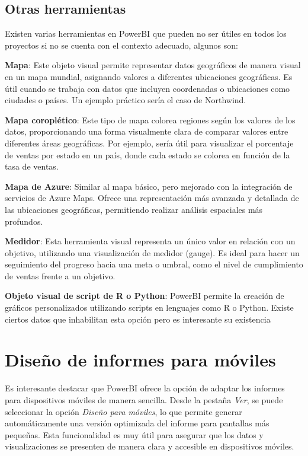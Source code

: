 \documentclass[12pt, a4paper, twoside]{article}
\begin{document}
	
	\subsection{Otras herramientas}
	
	Existen varias herramientas en PowerBI que pueden no ser útiles en todos los proyectos si no se cuenta con el contexto adecuado, algunos son:
	
	\textbf{Mapa}: Este objeto visual permite representar datos geográficos de manera visual en un mapa mundial, asignando valores a diferentes ubicaciones geográficas. Es útil cuando se trabaja con datos que incluyen coordenadas o ubicaciones como ciudades o países. Un ejemplo práctico sería el caso de Northwind.
	
	\textbf{Mapa coroplético}: Este tipo de mapa colorea regiones según los valores de los datos, proporcionando una forma visualmente clara de comparar valores entre diferentes áreas geográficas. Por ejemplo, sería útil para visualizar el porcentaje de ventas por estado en un país, donde cada estado se colorea en función de la tasa de ventas.
	
	\textbf{Mapa de Azure}: Similar al mapa básico, pero mejorado con la integración de servicios de Azure Maps. Ofrece una representación más avanzada y detallada de las ubicaciones geográficas, permitiendo realizar análisis espaciales más profundos.
	
	\textbf{Medidor}: Esta herramienta visual representa un único valor en relación con un objetivo, utilizando una visualización de medidor (gauge). Es ideal para hacer un seguimiento del progreso hacia una meta o umbral, como el nivel de cumplimiento de ventas frente a un objetivo.
	
	\textbf{Objeto visual de script de R o Python}: PowerBI permite la creación de gráficos personalizados utilizando scripts en lenguajes como R o Python. Existe ciertos datos que inhabilitan esta opción pero es interesante su existencia
	
	
	\section{Diseño de informes para móviles}
	
	Es interesante destacar que PowerBI ofrece la opción de adaptar los informes para dispositivos móviles de manera sencilla. Desde la pestaña \textit{Ver}, se puede seleccionar la opción \textit{Diseño para móviles}, lo que permite generar automáticamente una versión optimizada del informe para pantallas más pequeñas. Esta funcionalidad es muy útil para asegurar que los datos y visualizaciones se presenten de manera clara y accesible en dispositivos móviles.
	
\end{document}
